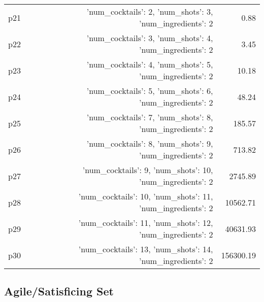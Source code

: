 \documentclass{article}
\begin{document}
\begin{center}
\begin{tabular}{@{}l|r|r@{}}
  p21&{'num\_cocktails': 2, 'num\_shots': 3, 'num\_ingredients': 2}&0.88\\
  p22&{'num\_cocktails': 3, 'num\_shots': 4, 'num\_ingredients': 2}&3.45\\
  p23&{'num\_cocktails': 4, 'num\_shots': 5, 'num\_ingredients': 2}&10.18\\
  p24&{'num\_cocktails': 5, 'num\_shots': 6, 'num\_ingredients': 2}&48.24\\
  p25&{'num\_cocktails': 7, 'num\_shots': 8, 'num\_ingredients': 2}&185.57\\
  p26&{'num\_cocktails': 8, 'num\_shots': 9, 'num\_ingredients': 2}&713.82\\
  p27&{'num\_cocktails': 9, 'num\_shots': 10, 'num\_ingredients': 2}&2745.89\\
  p28&{'num\_cocktails': 10, 'num\_shots': 11, 'num\_ingredients': 2}&10562.71\\
  p29&{'num\_cocktails': 11, 'num\_shots': 12, 'num\_ingredients': 2}&40631.93\\
  p30&{'num\_cocktails': 13, 'num\_shots': 14, 'num\_ingredients': 2}&156300.19
                            \end{tabular}
                            \end{center}
                    

                                \subsection*{Agile/Satisficing Set}
                                
\end{document}
